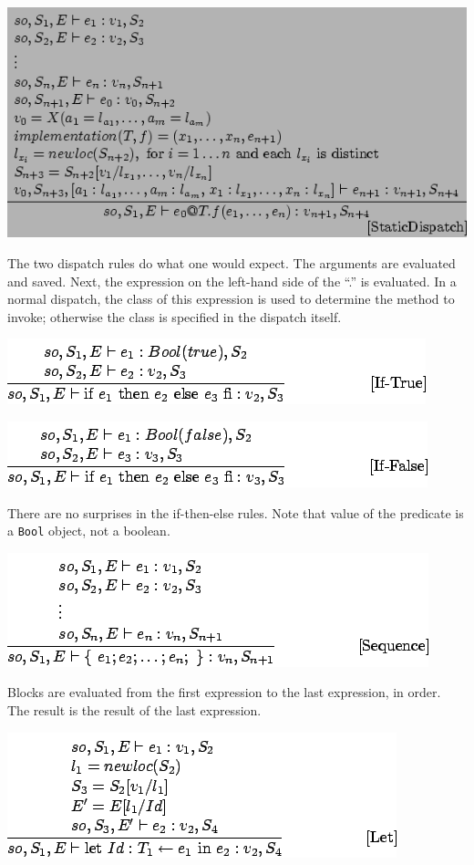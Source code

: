 \documentclass[]{article}
\begin{document}
\includegraphics{img167.png}

The two dispatch rules do what one would expect. The arguments are
evaluated and saved. Next, the expression on the left-hand side of the
``.'' is evaluated. In a normal dispatch, the class of this expression
is used to determine the method to invoke; otherwise the class is
specified in the dispatch itself.

\includegraphics{img168.png}

\includegraphics{img169.png}

There are no surprises in the if-then-else rules. Note that value of the
predicate is a \texttt{Bool} object, not a boolean.

\includegraphics{img170.png}

Blocks are evaluated from the first expression to the last expression,
in order. The result is the result of the last expression.

\includegraphics{img171.png}
\end{document}
